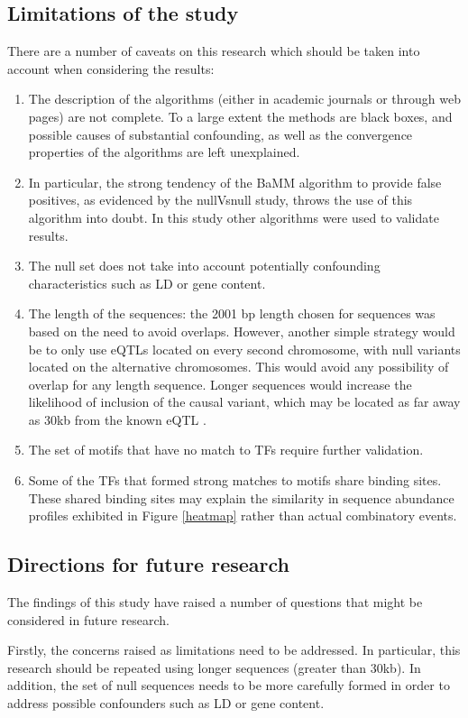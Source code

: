 \documentclass[12pt]{article}
\begin{document}
\subsection{Limitations of the study}
There are a number of caveats on this research which should be taken into account when considering the results:
\begin{enumerate}
\item The description of the algorithms (either in academic journals or through web pages) are not complete. To a large extent the methods are black boxes, and possible causes of substantial confounding, as well as the convergence properties of the algorithms are left unexplained.
\item In particular, the strong tendency of the BaMM algorithm to provide false positives, as evidenced by the nullVsnull study, throws the use of this algorithm into doubt. In this study other algorithms were used to validate results.
\item The null set does not take into account potentially confounding characteristics such as LD or gene content. 
\item The length of the sequences: the 2001 bp length chosen for sequences was based on the need to avoid overlaps. However, another simple strategy would be to only use eQTLs located on every second chromosome, with null variants located on the alternative chromosomes. This would avoid any possibility of overlap for any length sequence. Longer sequences would increase the likelihood of inclusion of the causal variant, which may be located as far away as 30kb from the known eQTL \citep{}.
\item The set of motifs that have no match to TFs require further validation.
\item Some of the TFs that formed strong matches to motifs share binding sites. These shared binding sites may explain the similarity in sequence abundance profiles exhibited in Figure \ref{heatmap} rather than actual combinatory events.
\end{enumerate}

\subsection{Directions for future research}
The findings of this study have raised a number of questions that might be considered in future research. 

Firstly, the concerns raised as limitations need to be addressed. In particular, this research should be repeated using longer sequences (greater than 30kb). In addition, the set of null sequences needs to be more carefully formed in order to address possible confounders such as LD or gene content.
\end{document}

